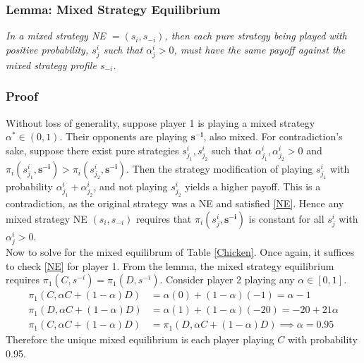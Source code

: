 \subsubsection{Lemma: Mixed Strategy Equilibrium}
\emph{In a mixed strategy NE $ = (s_i,s_{-i})$, then each pure strategy being played with positive probability, $s_j^i$ such that $\alpha_j^i>0$, must have the same payoff against the mixed strategy profile $s_{-i}$.  }
\subsubsection{Proof}
 Without loss of generality, suppose player 1 is playing a mixed strategy $\alpha^* \in (0,1)$. Their opponents are playing $\mathbf{s^{-i}}$, also mixed. For contradiction's sake, suppose there exist pure strategies $s_{j_1}^i, s_{j_2}^i$ such that $\alpha_{j_1}^i, \alpha_{j_2}^i >0$ and $\pi_i(s_{j_1}^i,\mathbf{s^{-i}}) > \pi_i(s_{j_2}^i,\mathbf{s^{-i}})$. Then the strategy modification of playing $s_{j_1}^i$ with probability $\alpha_{j_1}^i + \alpha_{j_2}^i$, and not playing $s_{j_2}^i$ yields a higher payoff. This is a contradiction, as the original strategy was a NE and satisfied \eqref{NE}. Hence any mixed strategy NE $(s_i,s_{-i})$ requires that $\pi_i(s_j^i, \mathbf{s^{-i}})$ is constant for all $s_j^i$ with $\alpha_j^i>0$. \halmos \\

Now to solve for the mixed equilibrum of Table \ref{Chicken}. Once again, it suffices to check \eqref{NE} for player 1. From the lemma, the mixed strategy equilibrium requires $\pi_1(C,s^{-i}) = \pi_1(D,s^{-i})$. 
Consider player 2 playing any $\alpha \in [0,1]$. \\
\begin{align*}
    \pi_1(C,\alpha C + (1-\alpha)D) &= \alpha (0) + (1-\alpha)(-1) = \alpha -1 \\
    \pi_1(D,\alpha C + (1-\alpha)D) &= \alpha (1) + (1-\alpha)(-20) = -20 + 21\alpha\\
    \pi_1(C,\alpha C + (1-\alpha)D) &= \pi_1(D,\alpha C
    + (1-\alpha)D) \implies \alpha = 0.95
\end{align*}
Therefore the unique mixed equilibrium is each player playing $C$ with probability 0.95. \\


